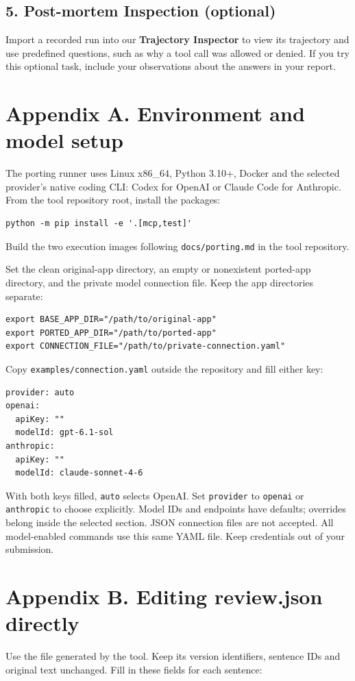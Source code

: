 \documentclass[10pt,a4paper]{article}
\begin{document}
\subsection*{5. Post-mortem Inspection (optional)}
Import a recorded run into our \textbf{Trajectory Inspector} to view its
trajectory and use predefined questions, such as why a tool call was allowed
or denied. If you try this optional task, include your observations about the
answers in your report.

\clearpage
\section*{Appendix A. Environment and model setup}
The porting runner uses Linux x86\_64, Python 3.10+, Docker and the selected
provider's native coding CLI: Codex for OpenAI or Claude Code for Anthropic.
From the tool repository root, install the packages:
\begin{lstlisting}
python -m pip install -e '.[mcp,test]'
\end{lstlisting}
Build the two execution images following \texttt{docs/porting.md} in the tool
repository.

Set the clean original-app directory, an empty or nonexistent ported-app directory,
and the private model connection file. Keep the app directories separate:
\begin{lstlisting}
export BASE_APP_DIR="/path/to/original-app"
export PORTED_APP_DIR="/path/to/ported-app"
export CONNECTION_FILE="/path/to/private-connection.yaml"
\end{lstlisting}

Copy \texttt{examples/connection.yaml} outside the repository and fill either key:
\begin{lstlisting}
provider: auto
openai:
  apiKey: ""
  modelId: gpt-6.1-sol
anthropic:
  apiKey: ""
  modelId: claude-sonnet-4-6
\end{lstlisting}
With both keys filled, \texttt{auto} selects OpenAI. Set \texttt{provider} to
\texttt{openai} or \texttt{anthropic} to choose explicitly. Model IDs and endpoints
have defaults; overrides belong inside the selected section. JSON connection
files are not accepted. All model-enabled commands use this same YAML file.
Keep credentials out of your submission.

\section*{Appendix B. Editing review.json directly}
Use the file generated by the tool. Keep its version identifiers, sentence IDs
and original text unchanged. Fill in these fields for each sentence:
\end{document}
